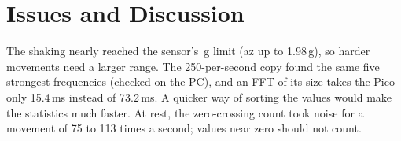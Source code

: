 \documentclass[conference]{IEEEtran}
\begin{document}
\section{Issues and Discussion}
The shaking nearly reached the sensor's \,g limit (az up to 1.98\,g), so harder movements need a
larger range. The 250-per-second copy found the same five strongest frequencies (checked on the PC),
and an FFT of its size takes the Pico only 15.4\,ms instead of 73.2\,ms. A quicker way of sorting the
values would make the statistics much faster. At rest, the zero-crossing count took noise for a movement of 75 to 113 times a second; values near zero should not count.
\end{document}
